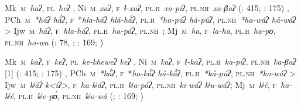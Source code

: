 \begin{adjustwidth}{6mm}{0pt}


Mk~\textsc{m}~\textit{haʔ}, \textsc{pl}~\textit{heʔ} \citep[166]{AG94} {\sep} Ni~\textsc{m}~\textit{xaʔ}, \textsc{f}~\textit{ɬ\mbox{-}xaʔ}, \textsc{pl.h}~\textit{xa\mbox{-}piʔ}, \textsc{pl.nh}~\textit{xa\mbox{-}βaʔ} (\citealt{AnG15-evid}: 415; \citealt{LC20}: 175) {\sep} PCh~\textsc{m}~\textit{*háʔ \recind *hǻʔ}, \textsc{f}~\textsc{*}\textit{hla\mbox{-}háʔ \recind hlå\mbox{-}hǻʔ}, \textsc{pl.h}~\textit{*ha\mbox{-}púʔ \recind *hå\mbox{-}púʔ}, \textsc{pl.nh}~\textit{*ha\mbox{-}wáʔ \recind *hå\mbox{-}wáʔ} > Ijw~\textsc{m}~\textit{háʔ}, \textsc{f}~\textit{hla\mbox{-}háʔ}, \textsc{pl.h}~\textit{ha\mbox{-}póʔ}, \textsc{pl.nh}~; Mj~\textsc{m}~\textit{ha}, \textsc{f}~\textit{la\mbox{-}ha}, \textsc{pl.h}~\textit{ha\mbox{-}pʊ}, \textsc{pl.nh}~\textit{ho\mbox{-}wa} (\citealt{JC14b}: 78, \citeyear{JC14a}; \citealt{ND09}: 169; \citealt{JC18})


Mk~\textsc{m}~\textit{kaʔ}, \textsc{f}~\textit{keʔ}, \textsc{pl}~\textit{ke\mbox{-}kheweʔ \recind keʔ} \citep[166]{AG94} {\sep} Ni~\textsc{m}~\textit{kaʔ}, \textsc{f}~\textit{ɬ\mbox{-}kaʔ}, \textsc{pl.h}~\textit{ka\mbox{-}piʔ}, \textsc{pl.nh}~\textit{ka\mbox{-}βaʔ} [1] (\citealt{AnG15-evid}: 415; \citealt{LC20}: 175) {\sep} PCh~\textsc{m}~\textit{*kǻʔ}, \textsc{f}~\textsc{*}\textit{ha\mbox{-}kǻʔ \recind *hå\mbox{-}kǻʔ}, \textsc{pl.h}~\textit{*kå\mbox{-}púʔ}, \textsc{pl.nh}~\textit{*ko\mbox{-}wáʔ} > Ijw~\textsc{m}~\textit{kʲáʔ \recind k<íʔ>}, \textsc{f}~\textit{ha\mbox{-}kʲáʔ}, \textsc{pl.h}~\textit{kʲa\mbox{-}póʔ}, \textsc{pl.nh}~\textit{ki\mbox{-}wáʔ \recind kʲu\mbox{-}wáʔ}; Mj~\textsc{m}~\textit{kʲé}, \textsc{f}~\textit{ha\mbox{-}kʲé}, \textsc{pl.h}~\textit{kʲe\mbox{-}pʊ́}, \textsc{pl.nh}~\textit{kʲo\mbox{-}wá} (\citealt{JC14a}; \citealt{ND09}: 169; \citealt{JC18})



\end{adjustwidth}
